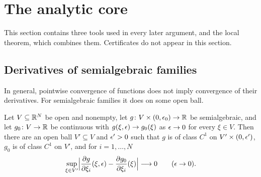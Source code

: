 \section{The analytic core}\label{sec:core}

This section contains three tools used in every later argument, and the local theorem, which combines them. Certificates do not appear in this section.

\subsection{Derivatives of semialgebraic families}

In general, pointwise convergence of functions does not imply convergence of their derivatives. For semialgebraic families it does on some open ball.

\begin{lemma}\label{lem:derivatives}
Let $V\subseteq\mathbb{R}^N$ be open and nonempty, let $g\colon V\times(0,\epsilon_0)\to\mathbb{R}$ be semialgebraic, and let $g_0\colon V\to\mathbb{R}$ be continuous with $g(\xi,\epsilon)\to g_0(\xi)$ as $\epsilon\to0$ for every $\xi\in V$. Then there are an open ball $V'\subseteq V$ and $\epsilon'>0$ such that $g$ is of class $C^1$ on $V'\times(0,\epsilon')$, $g_0$ is of class $C^1$ on $V'$, and for $i=1,\dots,N$
\[
\sup_{\xi\in V'}\Bigl|\frac{\partial g}{\partial\xi_i}(\xi,\epsilon)-\frac{\partial g_0}{\partial\xi_i}(\xi)\Bigr|\longrightarrow0\qquad(\epsilon\to0).
\]
\end{lemma}

